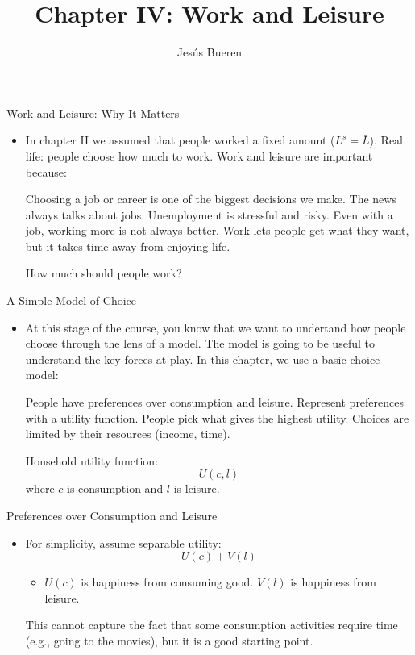 \documentclass[10pt,aspectratio=169]{beamer}
\title[Work and Leisure]{Chapter IV: Work and Leisure}
\author[Bueren]{Jes\'{u}s Bueren}
\institute{}
\date{}
\begin{document}
\begin{frame}[plain]
    \titlepage
\end{frame}


\begin{frame}{Work and Leisure: Why It Matters}

\begin{itemize}
    \item In chapter II we assumed that people worked a fixed amount ($L^s=\bar{L}$).  
    \itemvso Real life: people choose how much to work.
    \itemvso Work and leisure are important because:
    \begin{itemize}
        \itemvso Choosing a job or career is one of the biggest decisions we make.
        \itemvso The news always talks about jobs.
        \itemvso Unemployment is stressful and risky.
        \itemvso Even with a job, working more is not always better.
        \itemvso Work lets people get what they want, but it takes time away from enjoying life.
    \end{itemize}
    \itemvso How much should people work?
\end{itemize}

\end{frame}

\begin{frame}{A Simple Model of Choice}

\begin{itemize}
\item At this stage of the course, you know that we want to undertand how people choose through the lens of a model.
\itemvso The model is going to be useful to understand the key forces at play.
\itemvso In this chapter, we use a basic choice model:
\begin{itemize}
    \itemvso People have preferences over consumption and leisure.
    \itemvso Represent preferences with a utility function.
    \itemvso People pick what gives the highest utility.
    \itemvso Choices are limited by their resources (income, time).
\end{itemize}
\itemvso Household utility function:
\[
U(c, l)
\]
where $c$ is consumption and $l$ is leisure.
\end{itemize}

\end{frame}

\begin{frame}{Preferences over Consumption and Leisure}
\begin{itemize}
\item For simplicity, assume separable utility:
\[
U(c) + V(l)
\]
\vspace{-0.6cm}
\begin{itemize}
    \item $U(c)$ is happiness from consuming good.
    \itemvso $V( l )$ is happiness from leisure.
\end{itemize}
\itemvso This cannot capture the fact that some consumption activities require time (e.g., going to the movies), but it is a good starting point. 
\end{itemize}
\end{frame}
\end{document}
